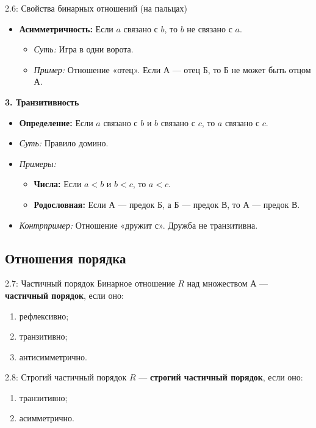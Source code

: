 \documentclass[a4paper,12pt]{article}
\begin{document}
\begin{definitionbox}{2.6: Свойства бинарных отношений (на пальцах)}
\begin{itemize}
		\item \textbf{Асимметричность:} Если $a$ связано с $b$, то $b$ не связано с $a$.
		\begin{itemize}
			\item \textit{Суть:} Игра в одни ворота.
			\item \textit{Пример:} Отношение «отец». Если А — отец Б, то Б не может быть отцом А.
		\end{itemize}
	\end{itemize}
	
	\textbf{3. Транзитивность}
	\begin{itemize}
		\item \textbf{Определение:} Если $a$ связано с $b$ и $b$ связано с $c$, то $a$ связано с $c$.
		\item \textit{Суть:} Правило домино.
		\item \textit{Примеры:}
		\begin{itemize}
			\item \textbf{Числа:} Если $a < b$ и $b < c$, то $a < c$.
			\item \textbf{Родословная:} Если А — предок Б, а Б — предок В, то А — предок В.
		\end{itemize}
		\item \textit{Контрпример:} Отношение «дружит с». Дружба не транзитивна.
	\end{itemize}
	
\end{definitionbox}
	
	\subsection{Отношения порядка}
	
	\begin{definitionbox}{2.7: Частичный порядок}
		Бинарное отношение $R$ над множеством А — \textbf{частичный порядок}, если оно:
		\begin{enumerate}
			\item рефлексивно;
			\item транзитивно;
			\item антисимметрично.
		\end{enumerate}
	\end{definitionbox}
	
	\begin{definitionbox}{2.8: Строгий частичный порядок}
		$R$ — \textbf{строгий частичный порядок}, если оно:
		\begin{enumerate}
			\item транзитивно;
			\item асимметрично.
		\end{enumerate}
	\end{definitionbox}
	
\end{document}
